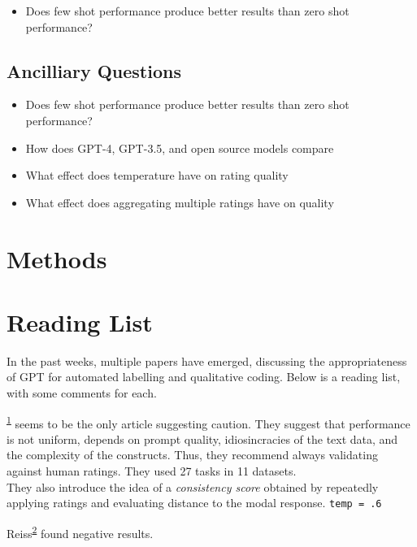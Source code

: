 \documentclass[
  10pt,
  twocolumn]{article}
\providecommand{\tightlist}{%
  \setlength{\itemsep}{0pt}\setlength{\parskip}{0pt}}\usepackage{longtable,booktabs,array}
\begin{document}
\begin{itemize}
\tightlist
\item
  Does few shot performance produce better results than zero shot
  performance?
\end{itemize}

\hypertarget{ancilliary-questions}{%
\subsection{Ancilliary Questions}\label{ancilliary-questions}}

\begin{itemize}
\tightlist
\item
  Does few shot performance produce better results than zero shot
  performance?
\item
  How does GPT-4, GPT-3.5, and open source models compare
\item
  What effect does temperature have on rating quality
\item
  What effect does aggregating multiple ratings have on quality
\end{itemize}

\hypertarget{methods}{%
\section{Methods}\label{methods}}

\hypertarget{reading-list}{%
\section{Reading List}\label{reading-list}}

In the past weeks, multiple papers have emerged, discussing the
appropriateness of GPT for automated labelling and qualitative coding.
Below is a reading list, with some comments for each.

\textsuperscript{\protect\hyperlink{ref-pangakis}{1}} seems to be the
only article suggesting caution. They suggest that performance is not
uniform, depends on prompt quality, idiosincracies of the text data, and
the complexity of the constructs. Thus, they recommend always validating
against human ratings. They used 27 tasks in 11 datasets.\\
They also introduce the idea of a \emph{consistency score} obtained by
repeatedly applying ratings and evaluating distance to the modal
response. \texttt{temp\ =\ .6}

Reiss\textsuperscript{\protect\hyperlink{ref-reiss}{2}} found negative
results.
\end{document}
